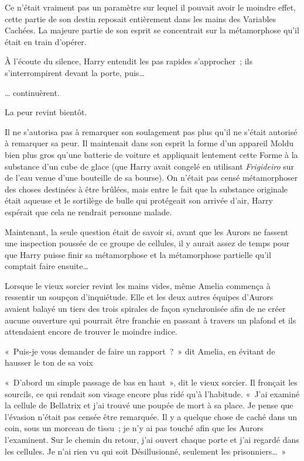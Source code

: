 Ce n'était vraiment pas un paramètre sur lequel il pouvait avoir le moindre effet, cette partie de son destin reposait entièrement dans les mains des Variables Cachées. La majeure partie de son esprit se concentrait sur la métamorphose qu'il était en train d'opérer.

À l'écoute du silence, Harry entendit les pas rapides s'approcher~; ils s'interrompirent devant la porte, puis…

… continuèrent.

La peur revint bientôt.

Il ne s'autorisa pas à remarquer son soulagement pas plus qu'il ne s'était autorisé à remarquer sa peur. Il maintenait dans son esprit la forme d'un appareil Moldu bien plus gros qu'une batterie de voiture et appliquait lentement cette Forme à la substance d'un cube de glace (que Harry avait congelé en utilisant \emph{Frigideiro} sur de l'eau venue d'une bouteille de sa bourse). On n'était pas censé métamorphoser des choses destinées à être brûlées, mais entre le fait que la substance originale était aqueuse et le sortilège de bulle qui protégeait son arrivée d'air, Harry espérait que cela ne rendrait personne malade.

Maintenant, la seule question était de savoir si, avant que les Aurors ne fassent une inspection poussée de ce groupe de cellules, il y aurait assez de temps pour que Harry puisse finir sa métamorphose et la métamorphose partielle qu'il comptait faire ensuite…

\later

Lorsque le vieux sorcier revint les mains vides, même Amelia commença à ressentir un soupçon d'inquiétude. Elle et les deux autres équipes d'Aurors avaient balayé un tiers des trois spirales de façon synchronisée afin de ne créer aucune ouverture qui pourrait être franchie en passant à travers un plafond et ils attendaient encore de trouver le moindre indice.

«~Puis-je vous demander de faire un rapport~?~» dit Amelia, en évitant de hausser le ton de sa voix

«~D'abord un simple passage de bas en haut~», dit le vieux sorcier. Il fronçait les sourcils, ce qui rendait son visage encore plus ridé qu'à l'habitude. «~J'ai examiné la cellule de Bellatrix et j'ai trouvé une poupée de mort à sa place. Je pense que l'évasion n'était pas censée être remarquée. Il y a quelque chose de caché dans un coin, sous un morceau de tissu~; je n'y ai pas touché afin que les Aurors l'examinent. Sur le chemin du retour, j'ai ouvert chaque porte et j'ai regardé dans les cellules. Je n'ai rien vu qui soit Désillusionné, seulement les prisonniers…~»

